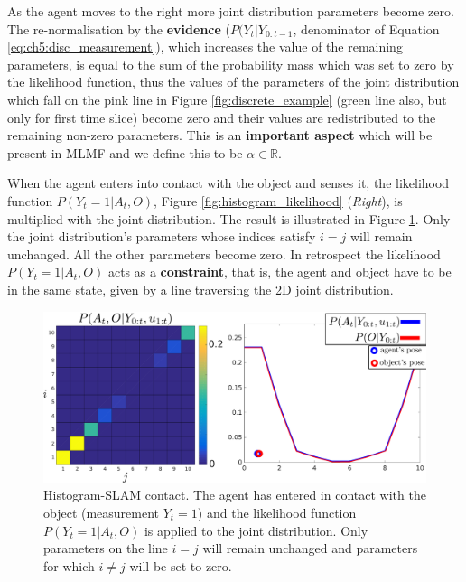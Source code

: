 As the agent moves to the right more joint distribution parameters become zero. The re-normalisation by the \textbf{evidence} ($P(Y_t|Y_{0:t-1}$, denominator of Equation \ref{eq:ch5:disc_measurement}), 
which increases the value of the remaining parameters, is equal to the sum of the probability mass which was set to zero by the likelihood function,
thus the values of the parameters of the joint distribution which fall on the pink line in Figure \ref{fig:discrete_example} 
(green line also, but only for first time slice) become zero and their values are redistributed to the remaining non-zero parameters. 
This is an \textbf{important aspect} which will be present in MLMF and we define this to be $\alpha \in \mathbb{R}$.

When the agent enters into contact with the object and senses it, the likelihood function $P(Y_t=1|A_t,O)$, Figure \ref{fig:histogram_likelihood} (\textit{Right}), is 
multiplied with the joint distribution. The result is illustrated in Figure \ref{fig:discrete_example_contact}. Only the joint distribution's parameters whose indices
satisfy $i = j$ will remain unchanged. All the other parameters become zero. In retrospect the likelihood $P(Y_t=1|A_t,O)$ acts as a \textbf{constraint}, 
that is, the agent and object have to be in the same state, given by a line traversing the 2D joint distribution.

\begin{figure}
 \centering
 \includegraphics[width=\textwidth]{./ch5-MLMF/Figures/explenation/joint_marginal_contact.pdf}
 \caption{Histogram-SLAM contact. The agent has entered in contact with the object (measurement $Y_t = 1$) and the likelihood function $P(Y_t=1|A_t,O)$ is applied to the joint
 distribution. Only parameters on the line $i=j$ will remain unchanged and parameters for which $i \not= j$ will be set to zero.}
 \label{fig:discrete_example_contact}
\end{figure}

